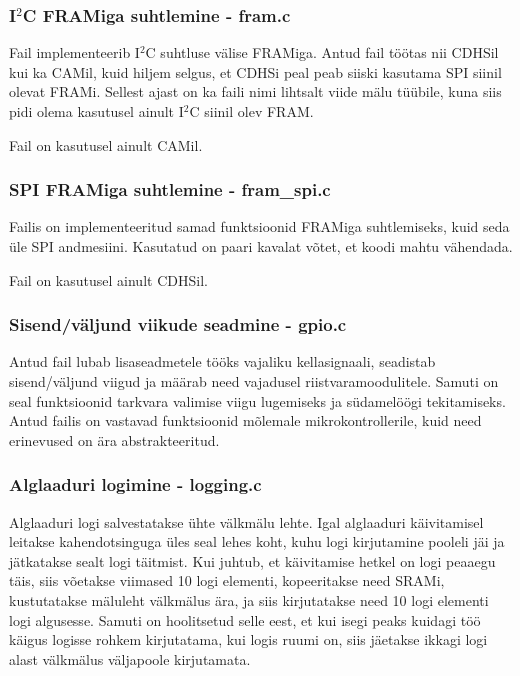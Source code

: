 \documentclass[12pt,a4paper]{article}
\newcommand{\iic}{I${}^2$C }
\begin{document}
\subsubsection{\texorpdfstring{\iic}{I2C} FRAMiga suhtlemine - \textbf{fram.c}}
Fail implementeerib \iic suhtluse välise FRAMiga. Antud fail töötas nii CDHSil
kui ka CAMil, kuid hiljem selgus, et CDHSi peal peab siiski kasutama SPI siinil
olevat FRAMi. Sellest ajast on ka faili nimi lihtsalt viide mälu tüübile, kuna
siis pidi olema kasutusel ainult \iic siinil olev FRAM.

Fail on kasutusel ainult CAMil.

\subsubsection{SPI FRAMiga suhtlemine - \textbf{fram\_spi.c}}
Failis on implementeeritud samad funktsioonid FRAMiga suhtlemiseks, kuid seda
üle SPI andmesiini. Kasutatud on paari kavalat võtet, et koodi mahtu vähendada.

Fail on kasutusel ainult CDHSil.

\subsubsection{Sisend/väljund viikude seadmine - \textbf{gpio.c}}
Antud fail lubab lisaseadmetele tööks vajaliku kellasignaali, seadistab
sisend/väljund viigud ja määrab need vajadusel riistvaramoodulitele. Samuti on
seal funktsioonid tarkvara valimise viigu lugemiseks ja südamelöögi
tekitamiseks. Antud failis on vastavad funktsioonid mõlemale mikrokontrollerile,
kuid need erinevused on ära abstrakteeritud.

\subsubsection{Alglaaduri logimine - \textbf{logging.c}}
Alglaaduri logi salvestatakse ühte välkmälu lehte. Igal alglaaduri käivitamisel
leitakse kahendotsinguga üles seal lehes koht, kuhu logi kirjutamine pooleli jäi
ja jätkatakse sealt logi täitmist. Kui juhtub, et käivitamise hetkel on logi
peaaegu täis, siis võetakse viimased 10 logi elementi, kopeeritakse need SRAMi,
kustutatakse mäluleht välkmälus ära, ja siis kirjutatakse need 10 logi elementi
logi algusesse. Samuti on hoolitsetud selle eest, et kui isegi peaks kuidagi töö
käigus logisse rohkem kirjutatama, kui logis ruumi on, siis jäetakse ikkagi logi
alast välkmälus väljapoole kirjutamata.
\end{document}
